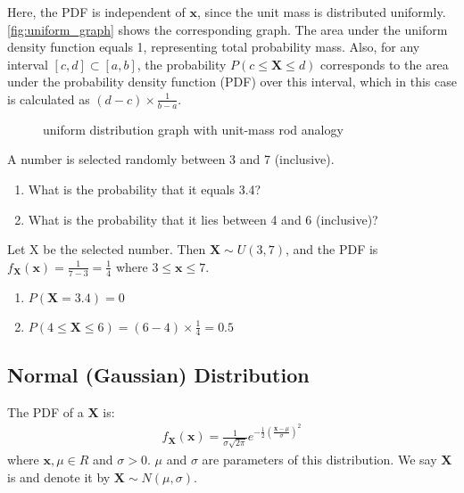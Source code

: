 Here, the PDF is independent of \( \bm{x} \), since the unit mass is distributed uniformly.
\autoref{fig:uniform_graph} shows the corresponding graph.
The area under the uniform density function equals 1, representing total probability mass.
Also, for any interval \( [c, d] \subset [a, b] \),
the probability \( P(c \leq \bm{X} \leq d) \) corresponds to the area under the probability density function (PDF) over this interval,
which in this case is calculated as \( (d - c) \times \frac{1}{b - a} \).
\begin{figure}[t]
\begin{center}
\end{center}
\caption{uniform distribution graph with unit-mass rod analogy}
\label{fig:uniform_graph}
\end{figure}

\begin{exmp}
    A number is selected randomly between 3 and 7 (inclusive).
    \begin{enumerate}
        \item What is the probability that it equals 3.4?
        \item What is the probability that it lies between 4 and 6 (inclusive)?
    \end{enumerate}
\end{exmp}
\begin{solution}
    Let X be the selected number.
    Then \( \bm{X} \sim U(3, 7) \),
    and the PDF is \( f_{\bm{X}}(\bm{x}) = \frac{1}{7 - 3} = \frac{1}{4} \) where \( 3 \leq \bm{x} \leq 7 \).
    \begin{enumerate}
        \item \( P(\bm{X} = 3.4) = 0 \)
        \item \( P(4 \leq \bm{X} \leq 6) = (6 - 4) \times \frac{1}{4} = 0.5 \)
    \end{enumerate}
\end{solution}

\subsection{Normal (Gaussian) Distribution}

The PDF of a  \( \bm{X} \) is:
\begin{gather*}
    f_{\bm{X}}(\bm{x}) = \frac{1}{\sigma\sqrt{2\pi}}e^{-\frac{1}{2}(\frac{\bm{x} - \mu}{\sigma})^2}
\end{gather*}
where \( \bm{x}, \mu \in R \) and \( \sigma > 0 \).
\( \mu \) and \( \sigma \) are parameters of this distribution.
We say \( \bm{X} \) is  and denote it by \( \bm{X} \sim N(\mu, \sigma) \).

